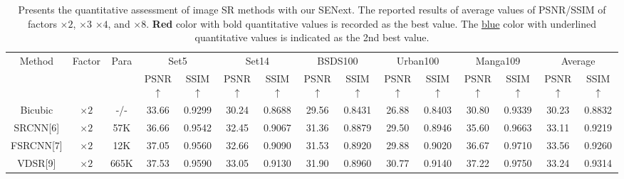 \documentclass{ieeeaccess}
\begin{document}
\begin{table}
\caption{Presents the quantitative assessment of image SR methods with our SENext. The reported results of average values of PSNR/SSIM of factors $\times 2$, $\times 3$ $\times 4$, and $\times 8$. {\color{red}\textbf{Red }} color with bold quantitative values is recorded as the best value. The {\color{blue}\underline{blue}} color with underlined quantitative values is indicated as the 2nd best value.}

\label{table1}
\setlength{\tabcolsep}{4.5 pt}
\begin{tabular}{|c|c|c|cc|cc|cc|cc|cc|cc|}
\hline
\multirow{2}{*}{Method} & \multirow{2}{*}{Factor} & \multirow{2}{*}{Para}& \multicolumn{2}{c|}{Set5}& \multicolumn{2}{c|}{Set14}& \multicolumn{2}{c|}{BSDS100}& \multicolumn{2}{c|}{Urban100}& \multicolumn{2}{c|}{Manga109}& \multicolumn{2}{c|}{Average}\\


 \cline{4-15}&&& \multicolumn{1}{c|}{PSNR$\uparrow$}  & SSIM{$\uparrow$}   & \multicolumn{1}{c|}{PSNR$\uparrow$}  & SSIM {$\uparrow$}   & \multicolumn{1}{c|}{PSNR$\uparrow$}  & SSIM {$\uparrow$}   & \multicolumn{1}{c|}{PSNR$\uparrow$}  & SSIM {$\uparrow$}  & \multicolumn{1}{c|}{PSNR$\uparrow$}  & SSIM {$\uparrow$}   & \multicolumn{1}{c|}{PSNR$\uparrow$}  & SSIM {$\uparrow$}  \\
 \hline

Bicubic&$\times2$ & -/-& \multicolumn{1}{c|}{33.66 } & 0.9299  & \multicolumn{1}{c|}{30.24 } &0.8688  & \multicolumn{1}{c|}{29.56 } & 0.8431  & \multicolumn{1}{c|}{26.88 } & 0.8403  & \multicolumn{1}{c|}{30.80 } & 0.9339&
\multicolumn{1}{c|}{30.23} & 0.8832 \\


SRCNN[6] & $\times 2$ & 57K& \multicolumn{1}{c|}{36.66 } & 0.9542  & \multicolumn{1}{c|}{32.45 } & 0.9067  &\multicolumn{1}{c|}{31.36 } & 0.8879  & \multicolumn{1}{c|}{29.50 } &0.8946 & \multicolumn{1}{c|}{35.60} &0.9663
&\multicolumn{1}{c|}{33.11} & 0.9219\\

FSRCNN[7]& $\times 2$& 12K & \multicolumn{1}{c|}{37.05} &0.9560& \multicolumn{1}{c|}{32.66} & 0.9090 &\multicolumn{1}{c|}{31.53} &0.8920& \multicolumn{1}{c|}{29.88} &0.9020& \multicolumn{1}{c|}{36.67} &0.9710
&\multicolumn{1}{c|}{33.56} & 0.9260\\


VDSR[9]& $\times 2$&665K& \multicolumn{1}{c|}{37.53} & 0.9590 & \multicolumn{1}{c|}{33.05} & 0.9130 &\multicolumn{1}{c|}{31.90} & 0.8960& \multicolumn{1}{c|}{30.77} & 0.9140 & \multicolumn{1}{c|}{37.22} & 0.9750
&\multicolumn{1}{c|}{33.24} & 0.9314\\




\end{tabular}
\end{table}
\end{document}
